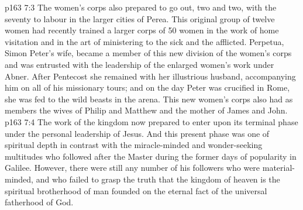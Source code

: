 \vs p163 7:3 The women’s corps also prepared to go out, two and two, with the seventy to labour in the larger cities of Perea. This original group of twelve women had recently trained a larger corps of 50 women in the work of home visitation and in the art of ministering to the sick and the afflicted. Perpetua, Simon Peter’s wife, became a member of this new division of the women’s corps and was entrusted with the leadership of the enlarged women’s work under Abner. After Pentecost she remained with her illustrious husband, accompanying him on all of his missionary tours; and on the day Peter was crucified in Rome, she was fed to the wild beasts in the arena. This new women’s corps also had as members the wives of Philip and Matthew and the mother of James and John.
\vs p163 7:4 The work of the kingdom now prepared to enter upon its terminal phase under the personal leadership of Jesus. And this present phase was one of spiritual depth in contrast with the miracle\hyp{}minded and wonder\hyp{}seeking multitudes who followed after the Master during the former days of popularity in Galilee. However, there were still any number of his followers who were material\hyp{}minded, and who failed to grasp the truth that the kingdom of heaven is the spiritual brotherhood of man founded on the eternal fact of the universal fatherhood of God.
\quizlink
